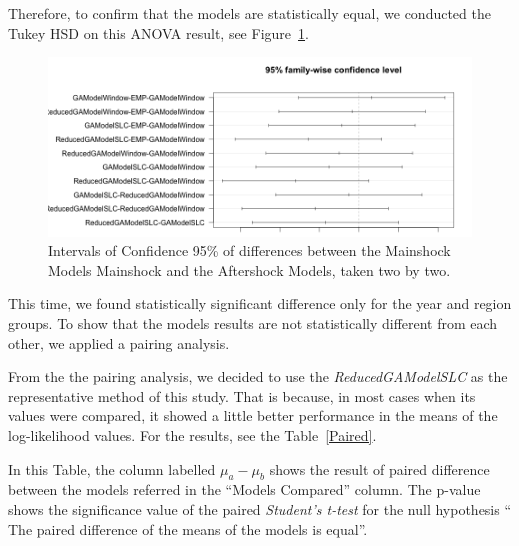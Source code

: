 Therefore, to confirm that the models are statistically equal, we conducted the Tukey HSD on this ANOVA result, see Figure~\ref{modelANOVA-100and5}.

\begin{figure}[H]
	\centering
	\includegraphics[scale=0.28]{img/modelANOVA-100and5.png}
	\caption{Intervals of Confidence 95\% of differences between the Mainshock Models Mainshock and the Aftershock Models, taken two by two.}
		\label{modelANOVA-100and5}
\end{figure}

This time, we found statistically significant difference only for the year and region groups. To show that the models results are not statistically different from each other, we applied a pairing analysis.

From the the pairing analysis, we decided to use the \textit{ReducedGAModelSLC} as the representative method of this study. That is because, in most cases when its values were compared, it showed a little better performance in the means of the log-likelihood values. For the results, see the Table~\ref{Paired}.

In this Table, the column labelled $\mu_a - \mu_b$ shows the result of paired difference between the models referred in the ``Models Compared'' column. The p-value shows the significance value of the paired {\it Student's t-test} for the null hypothesis `` The paired difference of the means of the models is equal''.


